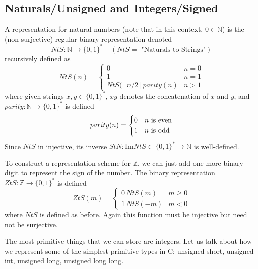 \subsection{Naturals/Unsigned and Integers/Signed}

  \begin{definition}
    A representation for natural numbers (note that in this context, $0 \in \mathbb{N}$) is the (non-surjective) regular binary representation denoted
    \begin{equation}
      NtS: \mathbb{N} \longrightarrow \{0,1\}^\ast \;\;\;\; (NtS= \text{ "Naturals to Strings"})
    \end{equation}
    recursively defined as 
    \[NtS(n) = \begin{cases}
    0 & n = 0 \\
    1 & n = 1 \\
    NtS(\left \lceil{n/2}\right \rceil parity(n) & n > 1 
    \end{cases}\]
    where given strings $x, y \in \{0,1\}^\ast$, $xy$ denotes the concatenation of $x$ and $y$, and $parity: \mathbb{N} \longrightarrow \{0,1\}^\ast$ is defined 
    \[parity(n) = \begin{cases}
    0 & n $\text{ is even}$ \\
    1 & n $\text{ is odd}$
    \end{cases}\]
    Since $NtS$ in injective, its inverse $StN: \mathrm{Im}{NtS} \subset \{0,1\}^\ast \longrightarrow \mathbb{N}$ is well-defined. 
  \end{definition}

  \begin{definition}
    To construct a representation scheme for $\mathbb{Z}$, we can just add one more binary digit to represent the sign of the number. The binary representation $ZtS: \mathbb{Z} \longrightarrow \{0, 1\}^\ast$ is defined
    \[ZtS(m) = \begin{cases}
    0\, NtS(m) & m \geq 0 \\
    1 \, NtS(-m) & m < 0
    \end{cases}\]
    where $NtS$ is defined as before. Again this function must be injective but need not be surjective. 
  \end{definition}

  The most primitive things that we can store are integers. Let us talk about how we represent some of the simplest primitive types in C: unsigned short, unsigned int, unsigned long, unsigned long long.

